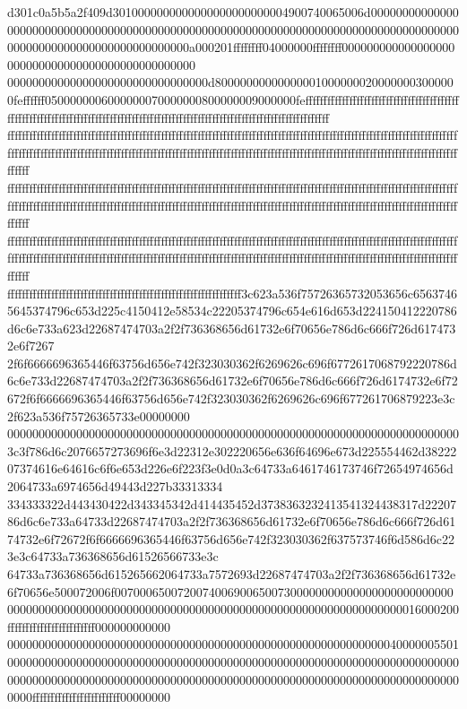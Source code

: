 d301c0a5b5a2f409d3010000000000000000000000004900740065006d0000000000000000000000000000000000000000000000000000000000000000000000000000000000000000000000000000000000000000000a000201ffffffff04000000ffffffff000000000000000000000000000000000000000000000000
00000000000000000000000000000000d800000000000000010000000200000003000000feffffff0500000006000000070000000800000009000000feffffffffffffffffffffffffffffffffffffffffffffffffffffffffffffffffffffffffffffffffffffffffffffffffffffffffffffffffffffffffffffffffff
ffffffffffffffffffffffffffffffffffffffffffffffffffffffffffffffffffffffffffffffffffffffffffffffffffffffffffffffffffffffffffffffffffffffffffffffffffffffffffffffffffffffffffffffffffffffffffffffffffffffffffffffffffffffffffffffffffffffffffffffffffffffffffff
ffffffffffffffffffffffffffffffffffffffffffffffffffffffffffffffffffffffffffffffffffffffffffffffffffffffffffffffffffffffffffffffffffffffffffffffffffffffffffffffffffffffffffffffffffffffffffffffffffffffffffffffffffffffffffffffffffffffffffffffffffffffffffff
ffffffffffffffffffffffffffffffffffffffffffffffffffffffffffffffffffffffffffffffffffffffffffffffffffffffffffffffffffffffffffffffffffffffffffffffffffffffffffffffffffffffffffffffffffffffffffffffffffffffffffffffffffffffffffffffffffffffffffffffffffffffffffff
ffffffffffffffffffffffffffffffffffffffffffffffffffffffffffffffff3c623a536f75726365732053656c65637465645374796c653d225c4150412e58534c22205374796c654e616d653d224150412220786d6c6e733a623d22687474703a2f2f736368656d61732e6f70656e786d6c666f726d6174732e6f7267
2f6f6666696365446f63756d656e742f323030362f6269626c696f6772617068792220786d6c6e733d22687474703a2f2f736368656d61732e6f70656e786d6c666f726d6174732e6f72672f6f6666696365446f63756d656e742f323030362f6269626c696f677261706879223e3c2f623a536f75726365733e00000000
0000000000000000000000000000000000000000000000000000000000000000000000003c3f786d6c2076657273696f6e3d22312e302220656e636f64696e673d225554462d3822207374616e64616c6f6e653d226e6f223f3e0d0a3c64733a6461746173746f72654974656d2064733a6974656d49443d227b33313334
334333322d443430422d343345342d414435452d3738363232413541324438317d2220786d6c6e733a64733d22687474703a2f2f736368656d61732e6f70656e786d6c666f726d6174732e6f72672f6f6666696365446f63756d656e742f323030362f637573746f6d586d6c223e3c64733a736368656d61526566733e3c
64733a736368656d615265662064733a7572693d22687474703a2f2f736368656d61732e6f70656e500072006f007000650072007400690065007300000000000000000000000000000000000000000000000000000000000000000000000000000000000000000016000200ffffffffffffffffffffffff000000000000
0000000000000000000000000000000000000000000000000000000000000400000055010000000000000000000000000000000000000000000000000000000000000000000000000000000000000000000000000000000000000000000000000000000000000000000000000000ffffffffffffffffffffffff00000000
